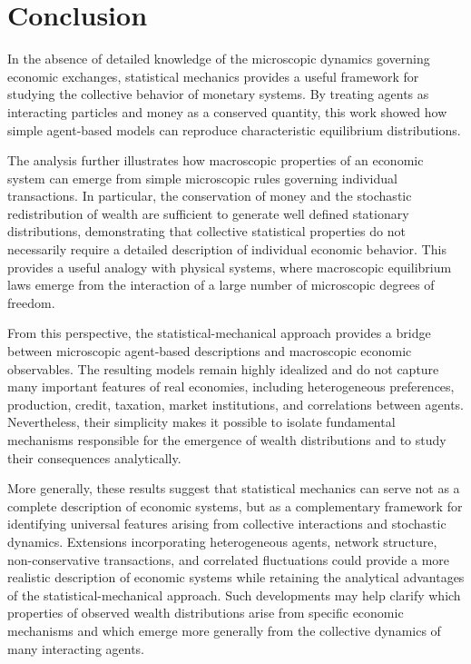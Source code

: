 
\section{Conclusion}

In the absence of detailed knowledge of the microscopic dynamics governing economic exchanges, statistical mechanics provides a useful framework for studying the collective behavior of monetary systems. 
By treating agents as interacting particles and money as a conserved quantity, this work showed how simple agent-based models can reproduce characteristic equilibrium distributions.

The analysis further illustrates how macroscopic properties of an economic system can emerge from simple microscopic rules governing individual transactions. 
In particular, the conservation of money and the stochastic redistribution of wealth are sufficient to generate well defined stationary distributions, demonstrating that collective statistical properties do not necessarily require a detailed description of individual economic behavior. 
This provides a useful analogy with physical systems, where macroscopic equilibrium laws emerge from the interaction of a large number of microscopic degrees of freedom.

From this perspective, the statistical-mechanical approach provides a bridge between microscopic agent-based descriptions and macroscopic economic observables. 
The resulting models remain highly idealized and do not capture many important features of real economies, including heterogeneous preferences, production, credit, taxation, market institutions, and correlations between agents. 
Nevertheless, their simplicity makes it possible to isolate fundamental mechanisms responsible for the emergence of wealth distributions and to study their consequences analytically.

More generally, these results suggest that statistical mechanics can serve not as a complete description of economic systems, but as a complementary framework for identifying universal features arising from collective interactions and stochastic dynamics. 
Extensions incorporating heterogeneous agents, network structure, non-conservative transactions, and correlated fluctuations could provide a more realistic description of economic systems while retaining the analytical advantages of the statistical-mechanical approach. 
Such developments may help clarify which properties of observed wealth distributions arise from specific economic mechanisms and which emerge more generally from the collective dynamics of many interacting agents.

